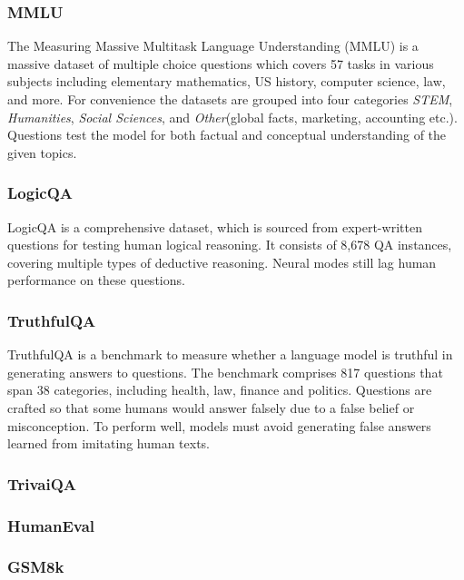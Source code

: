\documentclass[11pt]{article}
\begin{document}
\subsubsection{MMLU}

The Measuring Massive Multitask Language Understanding (MMLU) 
\cite{hendryckstest2021} \cite{hendrycks2021ethics} is a massive dataset of multiple choice questions which covers 57 tasks in various subjects including elementary mathematics, US history, computer science, law, and more. For convenience the datasets are grouped into 
four categories \emph{STEM},  \emph{Humanities}, \emph{Social Sciences}, and \emph{Other}(global facts, marketing, accounting etc.). Questions test the model for both factual and conceptual understanding of the given topics.

\subsubsection{LogicQA}

LogicQA \cite{liu2020logiqa} is a comprehensive dataset, which is sourced from expert-written questions for testing human logical reasoning. It consists of 8,678 QA instances, covering multiple types of deductive reasoning. Neural modes still lag human performance 
on these questions.

\subsubsection{TruthfulQA}

TruthfulQA \cite{lin2021truthfulqa} is a benchmark to measure whether 
a language model is truthful in generating answers to questions. The benchmark comprises 817 questions that span 38 categories, including health, law, finance and politics. Questions are crafted so that some humans would answer falsely due to a false belief or misconception. To perform well, models must avoid generating false answers learned from imitating human texts.  

\subsubsection{TrivaiQA}

\subsubsection{HumanEval}

\subsubsection{GSM8k}
\end{document}

